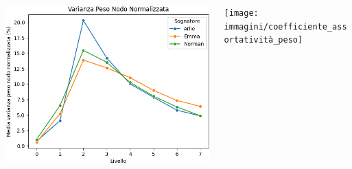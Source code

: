 \begin{minipage}[t]{\textwidth}
\begin{columns}
    \begin{column}{0.45\textwidth}
        \includegraphics[width=\textwidth]{immagini/varianza_peso_nodo_normalizzata}
    \end{column}
    \begin{column}{0.45\textwidth}
        \texttt{[image: immagini/coefficiente\_assortatività\_peso]}
    \end{column}
    \end{columns}
\end{minipage}